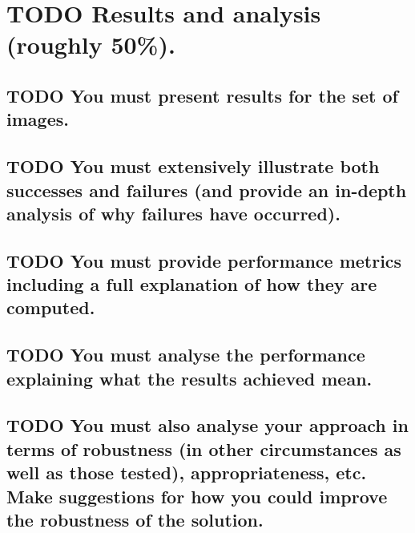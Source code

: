 \documentclass[11pt]{article}
\begin{document}
\section{{\bfseries\sffamily TODO} Results and analysis (roughly 50\%).}
\label{sec:orgf87fc83}

\subsection{{\bfseries\sffamily TODO} You must present results for the set of images.}
\label{sec:orgf014045}

\subsection{{\bfseries\sffamily TODO} You must extensively illustrate both successes and failures (and provide an in-depth analysis of why failures have occurred).}
\label{sec:org8a60267}

\subsection{{\bfseries\sffamily TODO} You must provide performance metrics including a full explanation of how they are computed.}
\label{sec:org6414380}

\subsection{{\bfseries\sffamily TODO} You must analyse the performance explaining what the results achieved mean.}
\label{sec:orge9c1956}

\subsection{{\bfseries\sffamily TODO} You must also analyse your approach in terms of robustness (in other circumstances as well as those tested), appropriateness, etc.  Make suggestions for how you could improve the robustness of the solution.}
\label{sec:org12b093d}
\end{document}

